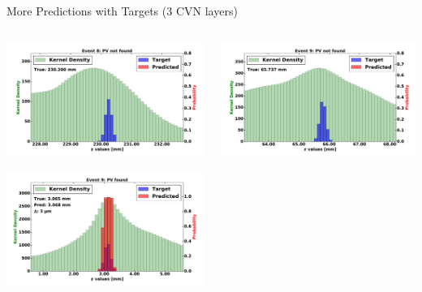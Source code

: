 \begin{frame}{More Predictions with Targets (3 CVN layers)}
  \begin{columns}[c]
        \begin{center}
            \includegraphics[width=1\textwidth,height=0.45\textwidth, trim=18 0 18 0]{images/120000_3layer_53.pdf}

            \includegraphics[width=1\textwidth, height=0.45\textwidth,trim=18 0 18 0]{images/120000_3layer_54.pdf}

        \end{center}
        \begin{center}
           \includegraphics[width=1\textwidth, height=0.45\textwidth, trim=18 0 18 0]{images/120000_3layer_55.pdf}


\end{center}
\end{columns}
\end{frame}
